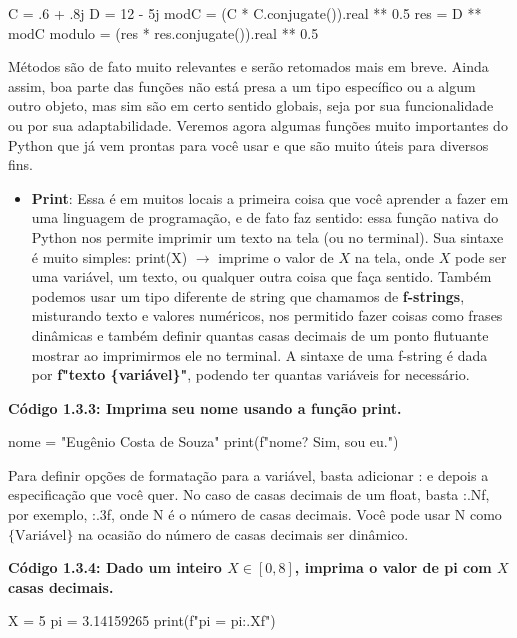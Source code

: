 \documentclass[11pt, a4paper]{article}
\begin{document}
\begin{code}
C = .6 + .8j
D = 12 - 5j
modC = (C * C.conjugate()).real ** 0.5
res = D ** modC
modulo = (res * res.conjugate()).real ** 0.5
\end{code}

Métodos são de fato muito relevantes e serão retomados mais em breve. Ainda assim, boa parte das funções não está presa a um tipo específico ou a algum outro objeto, mas sim são em certo sentido globais, seja por sua funcionalidade ou por sua adaptabilidade. Veremos agora algumas funções muito importantes do Python que já vem prontas para você usar e que são muito úteis para diversos fins.

\begin{itemize}
    \item \textbf{Print}: Essa é em muitos locais a primeira coisa que você aprender a fazer em uma linguagem de programação, e de fato faz sentido: essa função nativa do Python nos permite imprimir um texto na tela (ou no terminal). Sua sintaxe é muito simples: print(X) \(\rightarrow\) imprime o valor de \(X\) na tela, onde \(X\) pode ser uma variável, um texto, ou qualquer outra coisa que faça sentido. Também podemos usar um tipo diferente de string que chamamos de \textbf{f-strings}, misturando texto e valores numéricos, nos permitido fazer coisas como frases dinâmicas e também definir quantas casas decimais de um ponto flutuante mostrar ao imprimirmos ele no terminal. A sintaxe de uma f-string é dada por \textbf{f\tb[0.1]"\tb[0.1]texto \{variável\}"}, podendo ter quantas variáveis for necessário.
\end{itemize}

\textbf{Código 1.3.3: Imprima seu nome usando a função print.}

\begin{code}
nome = "Eugênio Costa de Souza"
print(f"{nome}? Sim, sou eu.")
\end{code}

Para definir opções de formatação para a variável, basta adicionar : e depois a especificação que você quer. No caso de casas decimais de um float, basta :.Nf, por exemplo, :.3f, onde N é o número de casas decimais. Você pode usar N como \(\{\text{Variável}\}\) na ocasião do número de casas decimais ser dinâmico.

\textbf{Código 1.3.4: Dado um inteiro \(X\in[0,8]\), imprima o valor de pi com \(X\) casas decimais.}

\begin{code}
X = 5
pi = 3.14159265
print(f"pi = {pi:.{X}f}")
\end{code}
\end{document}
